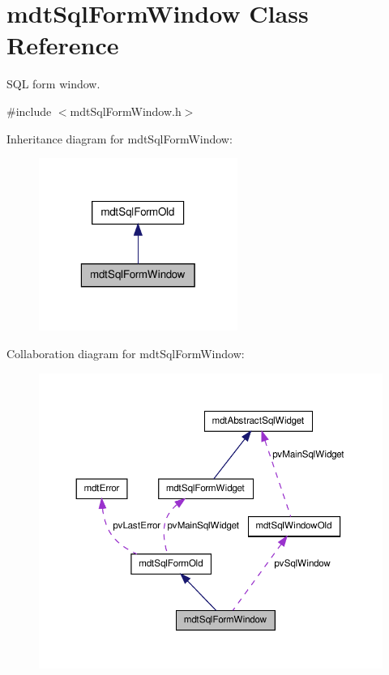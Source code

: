 \hypertarget{classmdt_sql_form_window}{
\section{mdtSqlFormWindow Class Reference}
\label{classmdt_sql_form_window}
}


SQL form window.  




{\ttfamily \#include $<$mdtSqlFormWindow.h$>$}



Inheritance diagram for mdtSqlFormWindow:\nopagebreak
\begin{figure}[H]
\begin{center}
\leavevmode
\includegraphics[width=184pt]{classmdt_sql_form_window__inherit__graph}
\end{center}
\end{figure}


Collaboration diagram for mdtSqlFormWindow:\nopagebreak
\begin{figure}[H]
\begin{center}
\leavevmode
\includegraphics[width=366pt]{classmdt_sql_form_window__coll__graph}
\end{center}
\end{figure}
